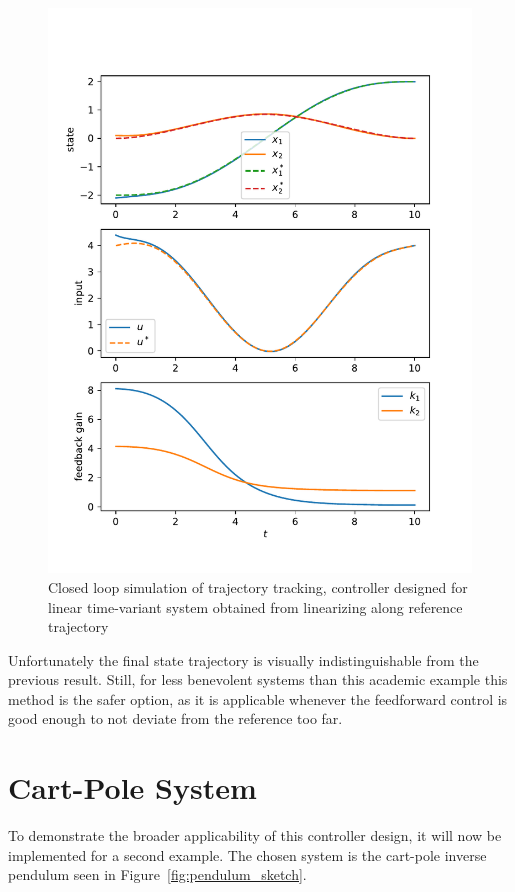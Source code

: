 \documentclass[a4paper,11pt,headinclude=true,headsepline,parskip=half,DIV=13]{scrartcl}
\begin{document}
\begin{figure}[ht]
    \centering
    \includegraphics[scale=1]{img/ludyk_ltv.pdf}
    \caption{Closed loop simulation of trajectory tracking, controller designed for linear time-variant system obtained from linearizing along reference trajectory}
    \label{fig:ludyk_ltv}
\end{figure}

Unfortunately the final state trajectory is visually indistinguishable from the previous result.
Still, for less benevolent systems than this academic example this method is the safer option, as it is applicable whenever the feedforward control is good enough to not deviate from the reference too far.

\FloatBarrier
\section{Cart-Pole System}

To demonstrate the broader applicability of this controller design, it will now be implemented for a second example.
The chosen system is the cart-pole inverse pendulum seen in Figure~\ref{fig:pendulum_sketch}.
\end{document}
